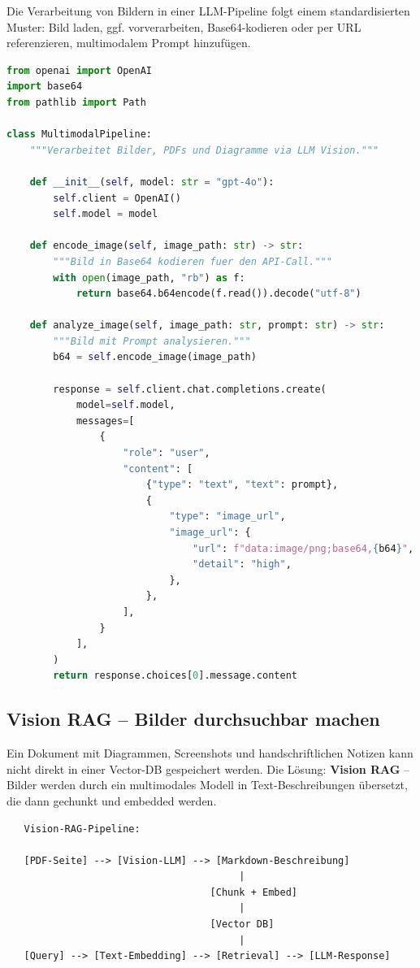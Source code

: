 Die Verarbeitung von Bildern in einer LLM-Pipeline folgt einem standardisierten Muster: Bild laden, ggf. vorverarbeiten, Base64-kodieren oder per URL referenzieren, multimodalem Prompt hinzufügen.

\begin{lstlisting}[language=Python, caption=Multimodale Image-Input-Pipeline]
from openai import OpenAI
import base64
from pathlib import Path

class MultimodalPipeline:
    """Verarbeitet Bilder, PDFs und Diagramme via LLM Vision."""

    def __init__(self, model: str = "gpt-4o"):
        self.client = OpenAI()
        self.model = model

    def encode_image(self, image_path: str) -> str:
        """Bild in Base64 kodieren fuer den API-Call."""
        with open(image_path, "rb") as f:
            return base64.b64encode(f.read()).decode("utf-8")

    def analyze_image(self, image_path: str, prompt: str) -> str:
        """Bild mit Prompt analysieren."""
        b64 = self.encode_image(image_path)

        response = self.client.chat.completions.create(
            model=self.model,
            messages=[
                {
                    "role": "user",
                    "content": [
                        {"type": "text", "text": prompt},
                        {
                            "type": "image_url",
                            "image_url": {
                                "url": f"data:image/png;base64,{b64}",
                                "detail": "high",
                            },
                        },
                    ],
                }
            ],
        )
        return response.choices[0].message.content
\end{lstlisting}

\subsection{Vision RAG -- Bilder durchsuchbar machen}

Ein Dokument mit Diagrammen, Screenshots und handschriftlichen Notizen kann nicht direkt in einer Vector-DB gespeichert werden. Die Lösung: \textbf{Vision RAG} -- Bilder werden durch ein multimodales Modell in Text-Beschreibungen übersetzt, die dann gechunkt und embedded werden.

\begin{verbatim}
   Vision-RAG-Pipeline:

   [PDF-Seite] --> [Vision-LLM] --> [Markdown-Beschreibung]
                                        |
                                   [Chunk + Embed]
                                        |
                                   [Vector DB]
                                        |
   [Query] --> [Text-Embedding] --> [Retrieval] --> [LLM-Response]
\end{verbatim}

